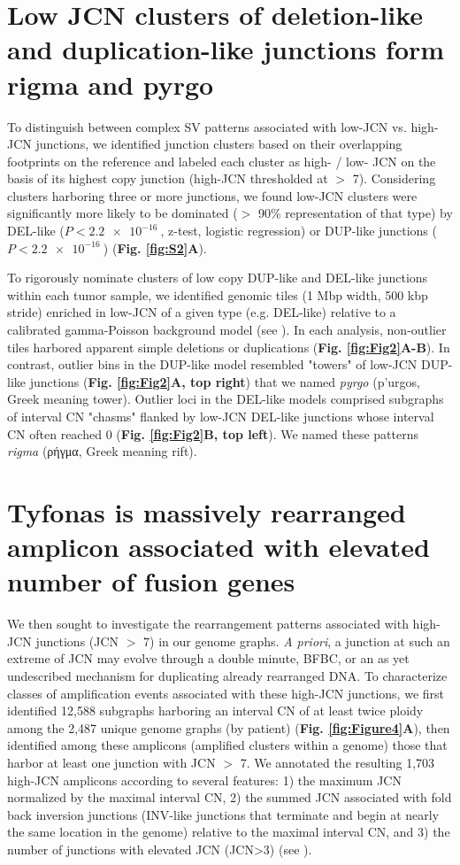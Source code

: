 \documentclass[phd,tocprelim]{cornell}
\begin{document}
\section{Low JCN clusters of deletion-like and duplication-like junctions form rigma and pyrgo}
To distinguish between complex SV patterns associated with low-JCN vs. high-JCN junctions, we identified junction clusters based on their overlapping footprints on the reference and labeled each cluster as high- / low- JCN on the basis of its highest copy junction (high-JCN thresholded at $>$ 7). Considering clusters harboring three or more junctions, we found low-JCN clusters were significantly more likely to be dominated ($>$ 90\% representation of that type) by DEL-like ($P < \SI{2.2e-16}{}$, z-test, logistic regression) or DUP-like junctions ($P < \SI{2.2e-16}{}$) (\textbf{Fig. \ref{fig:S2}A}).

To rigorously nominate clusters of low copy DUP-like and DEL-like junctions within each tumor sample, we identified genomic tiles (1 Mbp width, 500 kbp stride) enriched in low-JCN of a given type (e.g. DEL-like) relative to a calibrated gamma-Poisson background model (see ). In each analysis, non-outlier tiles harbored apparent simple deletions or duplications (\textbf{Fig. \ref{fig:Fig2}A-B}). In contrast, outlier bins in the DUP-like model resembled "towers" of low-JCN DUP-like junctions  (\textbf{Fig. \ref{fig:Fig2}A, top right}) that we named \textit{pyrgo} (\textgreek{p'urgos}, Greek meaning tower). Outlier loci in the DEL-like models comprised subgraphs of interval CN "chasms" flanked by low-JCN DEL-like junctions whose interval CN often reached 0 (\textbf{Fig. \ref{fig:Fig2}B, top left}).  We named these patterns \textit{rigma} (ρήγμα, Greek meaning rift).

\section{Tyfonas is massively rearranged amplicon associated with elevated number of fusion genes}
We then sought to investigate the rearrangement patterns associated with high-JCN junctions (JCN $>$ 7) in our genome graphs.  \textit{A priori}, a junction at such an extreme of JCN may evolve through a double minute, BFBC, or an as yet undescribed mechanism for duplicating already rearranged DNA. To characterize classes of  amplification events associated with these high-JCN junctions, we first identified 12,588 subgraphs harboring an interval CN of at least twice ploidy among the 2,487 unique genome graphs (by patient) (\textbf{Fig. \ref{fig:Figure4}A}), then identified among these amplicons (amplified clusters within a genome) those that harbor at least one junction with JCN $>$ 7.  We annotated the resulting 1,703 high-JCN amplicons according to several features: 1) the maximum JCN normalized by the maximal interval CN, 2) the summed JCN associated with fold back inversion junctions (INV-like junctions that terminate and begin at nearly the same location in the genome) relative to the maximal interval CN, and 3) the number of junctions with elevated JCN (JCN>3) (see ).
\end{document}
